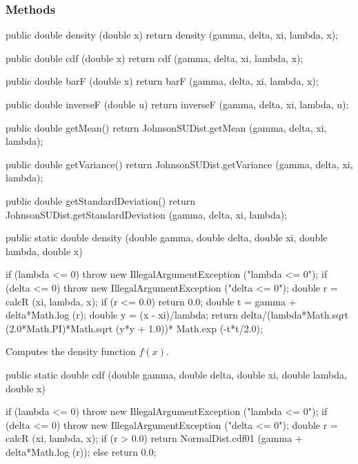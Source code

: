 \subsubsection* {Methods}
\begin{hide}
\begin{code}

   public double density (double x) {
      return density (gamma, delta, xi, lambda, x);
   }

   public double cdf (double x) {
      return cdf (gamma, delta, xi, lambda, x);
   }

   public double barF (double x) {
      return barF (gamma, delta, xi, lambda, x);
   }

   public double inverseF (double u){
      return inverseF (gamma, delta, xi, lambda, u);
   }

   public double getMean() {
      return JohnsonSUDist.getMean (gamma, delta, xi, lambda);
   }

   public double getVariance() {
      return JohnsonSUDist.getVariance (gamma, delta, xi, lambda);
   }

   public double getStandardDeviation() {
      return JohnsonSUDist.getStandardDeviation (gamma, delta, xi, lambda);
   }
\end{code}
\end{hide}\begin{code}

   public static double density (double gamma, double delta,
                                 double xi, double lambda, double x)\begin{hide} {
      if (lambda <= 0)
         throw new IllegalArgumentException ("lambda <= 0");
      if (delta <= 0)
         throw new IllegalArgumentException ("delta <= 0");
      double r = calcR (xi, lambda, x);
      if (r <= 0.0)
         return 0.0;
      double t = gamma + delta*Math.log (r);
      double y = (x - xi)/lambda;
      return delta/(lambda*Math.sqrt (2.0*Math.PI)*Math.sqrt (y*y + 1.0))*
           Math.exp (-t*t/2.0);
   }\end{hide}
\end{code}
\begin{tabb} Computes the density function $f(x)$.
\end{tabb}
\begin{code}

   public static double cdf (double gamma, double delta,
                             double xi, double lambda, double x)\begin{hide} {
      if (lambda <= 0)
         throw new IllegalArgumentException ("lambda <= 0");
      if (delta <= 0)
         throw new IllegalArgumentException ("delta <= 0");
      double r = calcR (xi, lambda, x);
      if (r > 0.0)
         return NormalDist.cdf01 (gamma + delta*Math.log (r));
      else
         return 0.0;
   }\end{hide}
\end{code}
